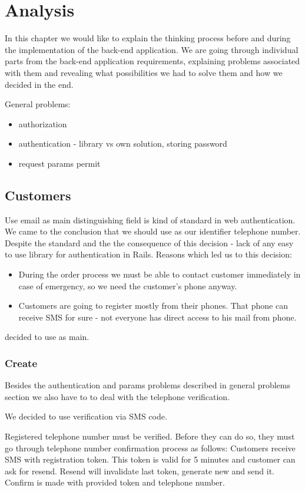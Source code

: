 \chapter{Analysis}
In this chapter we would like to explain the thinking process before and during the implementation of the back-end application. We are going through individual parts from the back-end application requirements, explaining problems associated with them and revealing what possibilities we had to solve them and how we decided in the end.

General problems:
\begin{itemize}
	\item authorization
	\item authentication - library vs own solution, storing password
	\item request params permit
\end{itemize}
\section{Customers}
Use email as main distinguishing field is kind of standard in web authentication. We came to the conclusion that we should use as our identifier telephone number. Despite the standard and the the consequence of this decision - lack of any easy to use library for authentication in Rails. Reasons which led us to this decision:
\begin{itemize}
	\item During the order process we must be able to contact customer immediately in case of emergency, so we need the customer's phone anyway.
	\item Customers are going to register mostly from their phones. That phone can receive SMS for sure - not everyone has direct access to his mail from phone. 
\end{itemize}
 decided to use as main. 
\subsection{Create}
Besides the authentication and params problems  described in general problems section we also have to to deal with the telephone verification.

We decided to use verification via SMS code.


 Registered telephone number must be verified.  Before they can do so, they must go through telephone number confirmation process as follows: Customers receive SMS with registration token. This token is valid for 5 minutes and customer can ask for resend. Resend will invalidate last token, generate new and send it. Confirm is made with provided token and telephone number. 